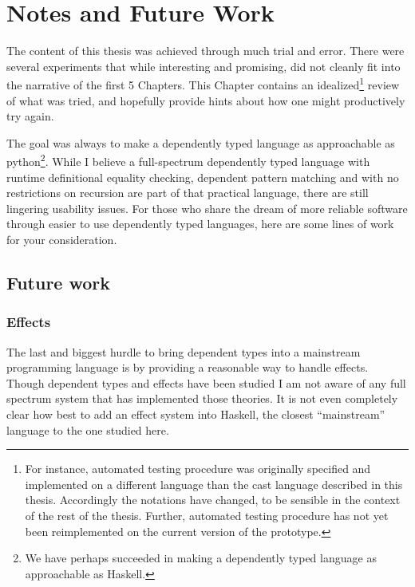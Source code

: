 \chapter{Notes and Future Work}
\label{chapter:Notes}
\thispagestyle{myheadings}
 
The content of this thesis was achieved through much trial and error.
There were several experiments that while interesting and promising, did not cleanly fit into the narrative of the first 5 Chapters.
This Chapter contains an idealized\footnote{
  For instance, automated testing procedure was originally specified and implemented on a different language than the cast language described in this thesis.
  Accordingly the notations have changed, to be sensible in the context of the rest of the thesis. %
  Further, automated testing procedure has not yet been reimplemented on the current version of the prototype.
} review of what was tried, and hopefully provide hints about how one might productively try again.
 
The goal was always to make a dependently typed language as approachable as python\footnote{We have perhaps succeeded in making a dependently typed language as approachable as Haskell.}.
While I believe a full-spectrum dependently typed language with runtime definitional equality checking, dependent pattern matching and with no restrictions on recursion are part of that practical language, there are still lingering usability issues.
For those who share the dream of more reliable software through easier to use dependently typed languages, here are some lines of work for your consideration.


 


\section{Future work}


\subsection{Effects}

The last and biggest hurdle to bring dependent types into a mainstream programming language is by providing a reasonable way to handle effects.
Though dependent types and effects have been studied I am not aware of any full spectrum system that has implemented those theories.
It is not even completely clear how best to add an effect system into Haskell, the closest ``mainstream'' language to the one studied here.

